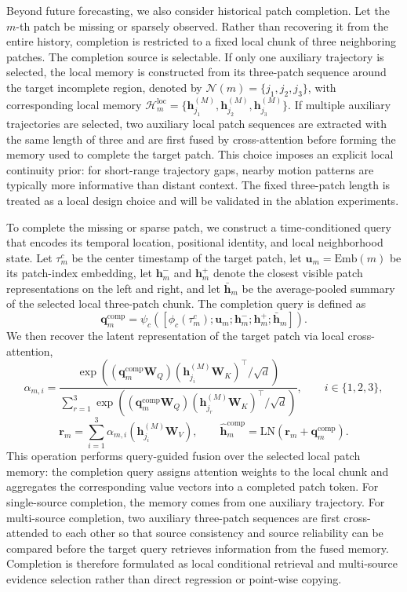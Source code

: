 Beyond future forecasting, we also consider historical patch completion. Let the $m$-th patch be missing or sparsely observed. Rather than recovering it from the entire history, completion is restricted to a fixed local chunk of three neighboring patches. The completion source is selectable. If only one auxiliary trajectory is selected, the local memory is constructed from its three-patch sequence around the target incomplete region, denoted by $\mathcal{N}(m)=\{j_1,j_2,j_3\}$, with corresponding local memory $\mathcal{H}_m^{\mathrm{loc}}=\{\bm{h}_{j_1}^{(M)},\bm{h}_{j_2}^{(M)},\bm{h}_{j_3}^{(M)}\}$. If multiple auxiliary trajectories are selected, two auxiliary local patch sequences are extracted with the same length of three and are first fused by cross-attention before forming the memory used to complete the target patch. This choice imposes an explicit local continuity prior: for short-range trajectory gaps, nearby motion patterns are typically more informative than distant context. The fixed three-patch length is treated as a local design choice and will be validated in the ablation experiments.

To complete the missing or sparse patch, we construct a time-conditioned query that encodes its temporal location, positional identity, and local neighborhood state. Let $\tau_m^{c}$ be the center timestamp of the target patch, let $\bm{u}_m=\mathrm{Emb}(m)$ be its patch-index embedding, let $\bm{h}_m^{-}$ and $\bm{h}_m^{+}$ denote the closest visible patch representations on the left and right, and let $\bar{\bm{h}}_m$ be the average-pooled summary of the selected local three-patch chunk. The completion query is defined as
\begin{equation}
\bm{q}_m^{\mathrm{comp}}=
\psi_c([\phi_c(\tau_m^{c});\bm{u}_m;\bm{h}_m^{-};\bm{h}_m^{+};\bar{\bm{h}}_m]).
\end{equation}
We then recover the latent representation of the target patch via local cross-attention,
\begin{equation}
\alpha_{m,i}=
\frac{
\exp\left(
(\bm{q}_m^{\mathrm{comp}}\bm{W}_Q)(\bm{h}_{j_i}^{(M)}\bm{W}_K)^\top/\sqrt{d}
\right)
}{
\sum_{r=1}^{3}
\exp\left(
(\bm{q}_m^{\mathrm{comp}}\bm{W}_Q)(\bm{h}_{j_r}^{(M)}\bm{W}_K)^\top/\sqrt{d}
\right)
}, \qquad i\in\{1,2,3\},
\end{equation}
\begin{equation}
\bm{r}_m=\sum_{i=1}^{3}\alpha_{m,i}(\bm{h}_{j_i}^{(M)}\bm{W}_V), \qquad
\hat{\bm{h}}_m^{\mathrm{comp}}=
\mathrm{LN}\!\left(\bm{r}_m+\bm{q}_m^{\mathrm{comp}}\right).
\end{equation}
This operation performs query-guided fusion over the selected local patch memory: the completion query assigns attention weights to the local chunk and aggregates the corresponding value vectors into a completed patch token. For single-source completion, the memory comes from one auxiliary trajectory. For multi-source completion, two auxiliary three-patch sequences are first cross-attended to each other so that source consistency and source reliability can be compared before the target query retrieves information from the fused memory. Completion is therefore formulated as local conditional retrieval and multi-source evidence selection rather than direct regression or point-wise copying.

